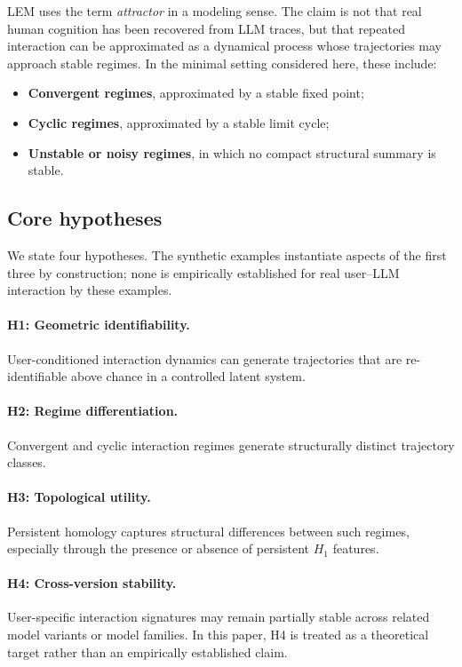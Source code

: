 \documentclass[11pt]{article}
\begin{document}
LEM uses the term \emph{attractor} in a modeling sense. The claim is not that real
human cognition has been recovered from LLM traces, but that repeated interaction
can be approximated as a dynamical process whose trajectories may approach stable
regimes. In the minimal setting considered here, these include:

\begin{itemize}[leftmargin=1.8em]
  \item \textbf{Convergent regimes}, approximated by a stable fixed point;
  \item \textbf{Cyclic regimes}, approximated by a stable limit cycle;
  \item \textbf{Unstable or noisy regimes}, in which no compact structural summary
        is stable.
\end{itemize}

\subsection{Core hypotheses}

We state four hypotheses. The synthetic examples instantiate aspects of the
first three by construction; none is empirically established for real user--LLM
interaction by these examples.

\paragraph{H1: Geometric identifiability.}
User-conditioned interaction dynamics can generate trajectories that are
re-identifiable above chance in a controlled latent system.

\paragraph{H2: Regime differentiation.}
Convergent and cyclic interaction regimes generate structurally distinct trajectory
classes.

\paragraph{H3: Topological utility.}
Persistent homology captures structural differences between such regimes, especially
through the presence or absence of persistent $H_1$ features.

\paragraph{H4: Cross-version stability.}
User-specific interaction signatures may remain partially stable across related
model variants or model families. In this paper, H4 is treated as a theoretical
target rather than an empirically established claim.
\end{document}
